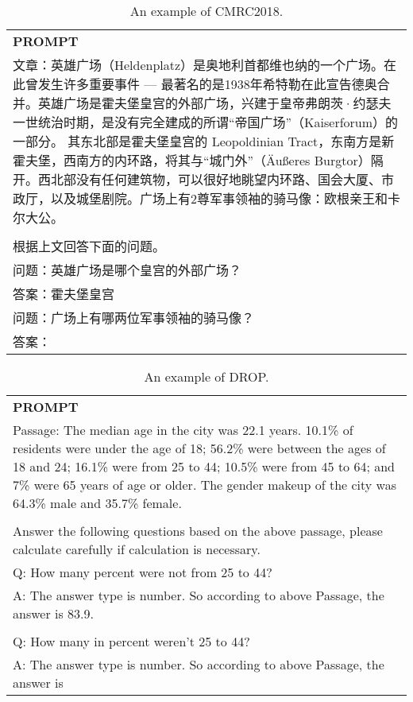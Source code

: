 \begin{table}[ht]
    \centering \small
\begin{tabular}{p{12cm}}
\toprule
\textbf{PROMPT}\\
文章：英雄广场（Heldenplatz）是奥地利首都维也纳的一个广场。在此曾发生许多重要事件 — 最著名的是1938年希特勒在此宣告德奥合并。英雄广场是霍夫堡皇宫的外部广场，兴建于皇帝弗朗茨·约瑟夫一世统治时期，是没有完全建成的所谓“帝国广场”（Kaiserforum）的一部分。 其东北部是霍夫堡皇宫的 Leopoldinian Tract，东南方是新霍夫堡，西南方的内环路，将其与“城门外”（Äußeres Burgtor）隔开。西北部没有任何建筑物，可以很好地眺望内环路、国会大厦、市政厅，以及城堡剧院。广场上有2尊军事领袖的骑马像：欧根亲王和卡尔大公。
\\
\\根据上文回答下面的问题。
\\问题：英雄广场是哪个皇宫的外部广场？
\\答案：霍夫堡皇宫
\\问题：广场上有哪两位军事领袖的骑马像？
\\答案：\\
\bottomrule
\end{tabular}
    \caption{\centering An example of CMRC2018.}
    \label{tab:cmrc2018_eval_format_example}
\end{table}

\begin{table}[ht]
    \centering \small
\begin{tabular}{p{12cm}}
\toprule
\textbf{PROMPT}\\
Passage: The median age in the city was 22.1 years. 10.1\% of residents were under the age of 18; 56.2\% were between the ages of 18 and 24; 16.1\% were from 25 to 44; 10.5\% were from 45 to 64; and 7\% were 65 years of age or older. The gender makeup of the city was 64.3\% male and 35.7\% female.
\\
\\Answer the following questions based on the above passage, please calculate carefully if calculation is necessary.
\\Q: How many percent were not from 25 to 44?
\\A: The answer type is number. So according to above Passage, the answer is 83.9.
\\
\\Q: How many in percent weren't 25 to 44?
\\A: The answer type is number. So according to above Passage, the answer is\\
\bottomrule
\end{tabular}
    \caption{\centering An example of DROP.}
    \label{tab:drop_eval_format_example}
\end{table}

